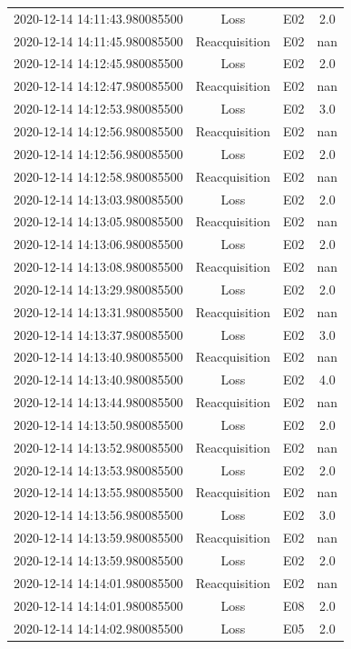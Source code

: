 \begin{enumerate}
\begin{longtabu}{cccc}
2020{-}12{-}14 14:11:43.980085500&Loss&E02&2.0\\%
2020{-}12{-}14 14:11:45.980085500&Reacquisition&E02&nan\\%
2020{-}12{-}14 14:12:45.980085500&Loss&E02&2.0\\%
2020{-}12{-}14 14:12:47.980085500&Reacquisition&E02&nan\\%
2020{-}12{-}14 14:12:53.980085500&Loss&E02&3.0\\%
2020{-}12{-}14 14:12:56.980085500&Reacquisition&E02&nan\\%
2020{-}12{-}14 14:12:56.980085500&Loss&E02&2.0\\%
2020{-}12{-}14 14:12:58.980085500&Reacquisition&E02&nan\\%
2020{-}12{-}14 14:13:03.980085500&Loss&E02&2.0\\%
2020{-}12{-}14 14:13:05.980085500&Reacquisition&E02&nan\\%
2020{-}12{-}14 14:13:06.980085500&Loss&E02&2.0\\%
2020{-}12{-}14 14:13:08.980085500&Reacquisition&E02&nan\\%
2020{-}12{-}14 14:13:29.980085500&Loss&E02&2.0\\%
2020{-}12{-}14 14:13:31.980085500&Reacquisition&E02&nan\\%
2020{-}12{-}14 14:13:37.980085500&Loss&E02&3.0\\%
2020{-}12{-}14 14:13:40.980085500&Reacquisition&E02&nan\\%
2020{-}12{-}14 14:13:40.980085500&Loss&E02&4.0\\%
2020{-}12{-}14 14:13:44.980085500&Reacquisition&E02&nan\\%
2020{-}12{-}14 14:13:50.980085500&Loss&E02&2.0\\%
2020{-}12{-}14 14:13:52.980085500&Reacquisition&E02&nan\\%
2020{-}12{-}14 14:13:53.980085500&Loss&E02&2.0\\%
2020{-}12{-}14 14:13:55.980085500&Reacquisition&E02&nan\\%
2020{-}12{-}14 14:13:56.980085500&Loss&E02&3.0\\%
2020{-}12{-}14 14:13:59.980085500&Reacquisition&E02&nan\\%
2020{-}12{-}14 14:13:59.980085500&Loss&E02&2.0\\%
2020{-}12{-}14 14:14:01.980085500&Reacquisition&E02&nan\\%
2020{-}12{-}14 14:14:01.980085500&Loss&E08&2.0\\%
2020{-}12{-}14 14:14:02.980085500&Loss&E05&2.0\\%

\end{longtabu}
\end{enumerate}

